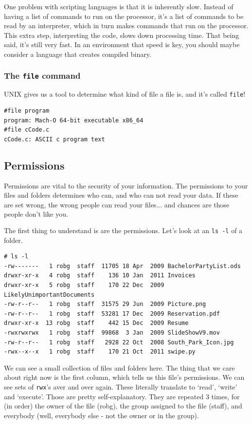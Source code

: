 	One problem with scripting languages is that it is inherently slow. Instead of having a list 
	of commands to run on the processor, it's a list of commands to be read by an interpreter, which
	in turn makes commands that run on the processor. This extra step, interpreting the code, slows down processing time.
	That being said, it's still very fast. In an environment that speed is key, you should maybe consider a 
	language that creates compiled binary.
	
\subsubsection{The {\tt file} command}

	UNIX gives us a tool to determine what kind of file a file is, and it's called {\tt file}!

\begin{verbatim}	
#file program
program: Mach-O 64-bit executable x86_64
#file cCode.c
cCode.c: ASCII c program text
\end{verbatim}	


\subsection {Permissions}
	
	Permissions are vital to the security of your information. The permissions to your files and folders
	determines who can, and who can not read your data. If these are set wrong, the wrong people can read
	your files... and chances are those people don't like you.
	
	The first thing to understand is are the permissions. Let's look at an {\tt ls -l} of a folder.
\begin{verbatim}
# ls -l
-rw-------   1 robg  staff  11705 18 Apr  2009 BachelorPartyList.ods
drwxr-xr-x   4 robg  staff    136 10 Jan  2011 Invoices
drwxr-xr-x   5 robg  staff    170 22 Dec  2009 LikelyUnimportantDocuments
-rw-r--r--   1 robg  staff  31575 29 Jun  2009 Picture.png
-rw-r--r--   1 robg  staff  53281 17 Dec  2009 Reservation.pdf
drwxr-xr-x  13 robg  staff    442 15 Dec  2009 Resume
-rwxrwxrwx   1 robg  staff  99868  3 Jan  2009 SlideShowV9.mov
-rw-r--r--   1 robg  staff   2928 22 Oct  2008 South_Park_Icon.jpg
-rwx--x--x   1 robg  staff    170 21 Oct  2011 swipe.py
\end{verbatim} 
We can see a small collection of files and folders here. The thing that we care about right 
now is the first column, which tells us this file's permissions. We can see sets of 
{\tt rwx}'s aver and over again. These literally translate to `read', `write' and `execute'. 
Those are pretty self-explanatory. They are repeated 3 times, for (in order) the owner of the file (robg),
the group assigned to the file (staff), and everybody (well, everybody else - not the owner or in the group).

